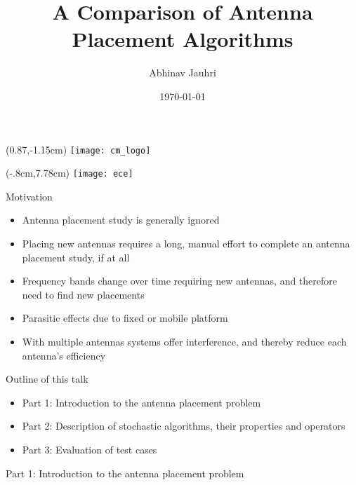 \documentclass{beamer}
\title{\color{univred} A Comparison of Antenna Placement Algorithms}
\author{Abhinav Jauhri}
\date{\today}
\let\otp\titlepage
\renewcommand{\titlepage}{\otp\addtocounter{framenumber}{-1}}
\begin{document}
\begin{frame}[plain]
    \begin{textblock*}{100mm}(0.87\textwidth,-1.15cm)
        \texttt{[image: cm\_logo]}
    \end{textblock*}
    \begin{textblock*}{10mm}(-.8cm,7.78cm)
        \texttt{[image: ece]}
    \end{textblock*}
    \color{univred}
    \titlepage
\end{frame}

\begin{frame}{Motivation}
\begin{itemize} \itemsep1.5em
        \item Antenna placement study is generally ignored 
        \item Placing new antennas requires a long, manual effort to complete an antenna placement study, if at all
        \item Frequency bands change over time requiring new antennas, and therefore need to find new placements
        \item Parasitic effects due to fixed or mobile platform 
        \item With multiple antennas systems offer interference, and thereby reduce each antenna's efficiency
    \end{itemize}
    \vspace{5mm}
\end{frame}

\begin{frame}{Outline of this talk}
    \begin{itemize}
        \setlength\itemsep{2em}
        \item Part 1: Introduction to the antenna placement problem
        \item Part 2: Description of stochastic algorithms, their properties and operators
        \item Part 3: Evaluation of test cases
    \end{itemize}
\end{frame}

\begin{frame}{\null}
    \begin{tcolorbox}[colback=green!5]
        \centering\Huge
        Part 1: Introduction to the antenna placement problem
    \end{tcolorbox}
\end{frame}
\end{document}
